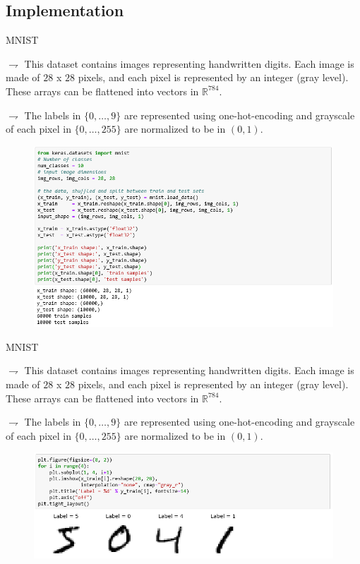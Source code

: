 \documentclass[9pt]{beamer}
\newcommand\R{\mathds{R}}
\begin{document}
\subsection{Implementation}

\begin{frame}{MNIST}

$\rightharpoondown$ This dataset contains images representing handwritten digits. Each image is made of \alert{$28$ x $28$ pixels}, and each pixel is represented by an integer (gray level). These arrays can be flattened into vectors in $\R^{784}$. 

$\rightharpoondown$ The \alert{labels in $\{0,\ldots,9\}$ are represented using one-hot-encoding} and grayscale of each pixel in $\{0,\ldots, 255\}$ are normalized to be in $(0,1)$.

\begin{figure}
\begin{center}
\includegraphics[width = .85\linewidth]{./MNIST_data1.png}
\end{center}
\end{figure}
\end{frame}

\begin{frame}{MNIST}

$\rightharpoondown$ This dataset contains images representing handwritten digits. Each image is made of \alert{$28$ x $28$ pixels}, and each pixel is represented by an integer (gray level). These arrays can be flattened into vectors in $\R^{784}$. 

$\rightharpoondown$ The \alert{labels in $\{0,\ldots,9\}$ are represented using one-hot-encoding} and grayscale of each pixel in $\{0,\ldots, 255\}$ are normalized to be in $(0,1)$.

\begin{figure}
\begin{center}
\includegraphics[width = .9\linewidth]{./MNIST_data2.png}
\end{center}
\end{figure}
\end{frame}
\end{document}
